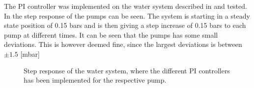 The PI controller was implemented on the water system described in  and tested. In  the step response of the pumps can be seen. The system is starting in a steady state position of 0.15 bars and is then giving a step increase of 0.15 bars to each pump at different times. It can be seen that the pumps has some small deviations. This is however deemed fine, since the largest deviations is between $\pm 1.5$ [mbar]

\begin{figure}[H]
\centering

\caption{Step response of the water system, where the different PI controllers has been implemented for the respective pump.}
\label{fig:Tikz_PI_PUMP_GAINNNN}
\end{figure}





% 


% 


